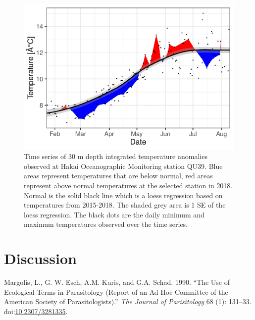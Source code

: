 \documentclass[fleqn,10pt]{wlpeerj} %
\begin{document}
\begin{figure}
\includegraphics[width=0.8\linewidth]{peer_j_migration_dynamics_files/figure-latex/sst-1} \caption{Time series of 30 m depth integrated temperature anomalies observed at Hakai Oceanographic Monitoring station QU39. Blue areas represent temperatures that are below normal, red areas represent above normal temperatures at the selected station in 2018. Normal is the solid black line which is a loess regression based on temperatures from 2015-2018. The shaded grey area is 1 SE of the loess regression. The black dots are the daily minimum and maximum temperatures observed over the time series.}\label{fig:sst}
\end{figure}

\section*{Discussion}\label{discussion}

\hypertarget{refs}{}
\hypertarget{ref-Margolis1990}{}
Margolis, L., G. W. Esch, A.M. Kuris, and G.A. Schad. 1990. ``The Use of
Ecological Terms in Parasitology (Report of an Ad Hoc Committee of the
American Society of Parasitologists).'' \emph{The Journal of
Parisitology} 68 (1): 131--33.
doi:\href{https://doi.org/10.2307/3281335}{10.2307/3281335}.
\end{document}
